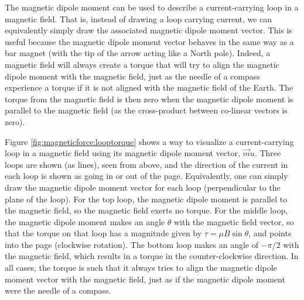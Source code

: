 The magnetic dipole moment can be used to describe a current-carrying loop in a magnetic field. That is, instead of drawing a loop carrying current, we can equivalently simply draw the associated magnetic dipole moment vector. This is useful because the magnetic dipole moment vector behaves in the same way as a bar magnet (with the tip of the arrow acting like a North pole). Indeed, a magnetic field will always create a torque that will try to align the magnetic dipole moment with the magnetic field, just as the needle of a compass experience a torque if it is not aligned with the magnetic field of the Earth. The torque from the magnetic field is then zero when the magnetic dipole moment is parallel to the magnetic field (as the cross-product between co-linear vectors is zero). 

Figure \ref{fig:magneticforce:looptorque} shows a way to visualize a current-carrying loop in a magnetic field using its magnetic dipole moment vector, $\vec mu$.  
Three loops are shown (as lines), seen from above, and the direction of the current in each loop is shown as going in or out of the page. Equivalently, one can simply draw the magnetic dipole moment vector for each loop (perpendicular to the plane of the loop). For the top loop, the magnetic dipole moment is parallel to the magnetic field, so the magnetic field exerts no torque. For the middle loop, the magnetic dipole moment makes an angle $\theta$ with the magnetic field vector, so that the torque on that loop has a magnitude given by $\tau=\mu B \sin\theta$, and points into the page (clockwise rotation). The bottom loop makes an angle of $-\pi/2$ with the magnetic field, which results in a torque in the counter-clockwise direction. In all cases, the torque is such that it always tries to align the magnetic dipole moment vector with the magnetic field, just as if the magnetic dipole moment were the needle of a compass. 

